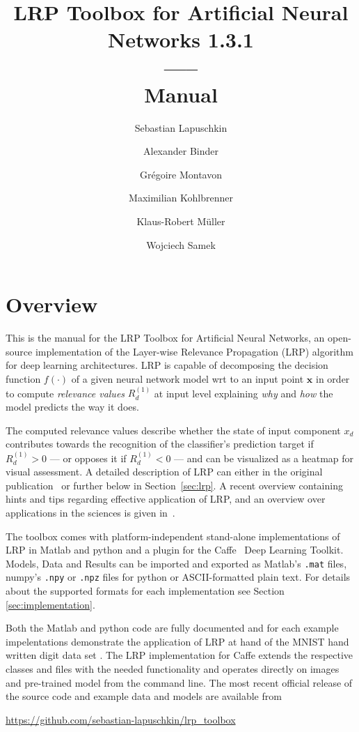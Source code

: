 \documentclass[a4wide]{article}
\newcommand{\x}{\boldsymbol{x}}
\begin{document}
\title{LRP Toolbox for Artificial Neural Networks 1.3.1 \\ ----- \\ Manual}

\author{Sebastian Lapuschkin \and Alexander Binder \and Gr\'egoire Montavon \and Maximilian Kohlbrenner \and Klaus-Robert M\"uller \and Wojciech Samek}

\maketitle

\tableofcontents

\newpage

\section{Overview}
This is the manual for the LRP Toolbox for Artificial Neural Networks,
an open-source implementation of the Layer-wise Relevance Propagation (LRP)\cite{bach15}
algorithm for deep learning architectures.
LRP is capable of decomposing the decision function $f(\cdot)$ of a given neural network model wrt to an input point $\x$ in order to compute \emph{relevance values} $R^{(1)}_d$ at input level explaining \emph{why} and \emph{how} the model predicts the way it does.

The computed relevance values describe whether the state of input component $x_d$ contributes towards the recognition of the classifier's prediction target if $R^{(1)}_d > 0$ --- or opposes it if $R^{(1)}_d < 0$ --- and can be visualized as a heatmap for visual assessment.
A detailed description of LRP can either in the original publication~\cite{bach15} or further below in Section~\ref{sec:lrp}.
A recent overview containing hints and tips regarding effective application of LRP, and an overview over applications in the sciences is given in~\cite{samek2020toward}.

The toolbox comes with platform-independent stand-alone implementations of LRP in Matlab and python and a plugin for the Caffe~\cite{jia2014caffe} Deep Learning Toolkit.
Models, Data and Results can be imported and exported as Matlab's \texttt{.mat} files, numpy's \texttt{.npy} or \texttt{.npz} files for python or ASCII-formatted plain text. For details about the supported formats for each implementation see Section \ref{sec:implementation}.

Both the Matlab and python code are fully documented and for each example impelentations demonstrate the application of LRP at hand of the MNIST hand written digit data set \cite{lecun1998mnist}.
The LRP implementation for Caffe extends the respective classes and files with the needed functionality and operates directly on images and pre-trained model from the command line.
The most recent official release of the source code and example data and models are available from
\begin{center}
\url{https://github.com/sebastian-lapuschkin/lrp_toolbox}
\end{center}
\end{document}
